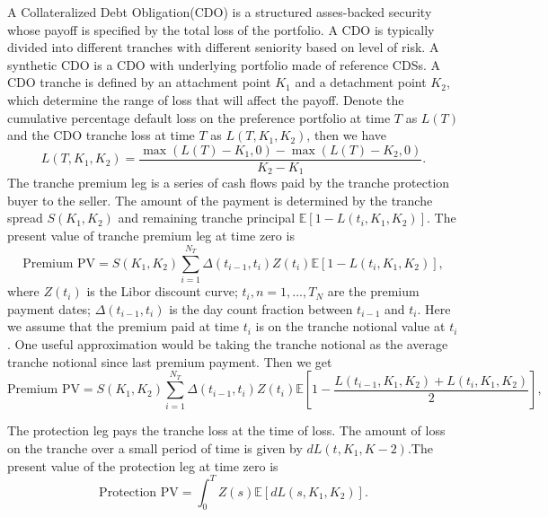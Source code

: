 \documentclass[11pt,a4paper]{article}
\theoremstyle{definition}
\numberwithin{equation}{section}
\begin{document}
	A Collateralized Debt Obligation(CDO) is a structured asses-backed security whose payoff is specified by the total loss of the portfolio. A CDO is typically divided into different tranches with different seniority based on level of risk. A synthetic CDO is a CDO with underlying portfolio made of reference CDSs. A CDO tranche is defined by an attachment point $K_1$ and a detachment point $K_2$, which determine the range of loss that will affect the payoff. Denote the cumulative percentage default loss on the preference portfolio at time $T$ as $L(T)$ and the CDO tranche loss at time $T$ as $L(T, K_1, K_2)$, then we have
	\begin{equation}
	L(T, K_1, K_2) = \frac{\max(L(T)-K_1,0)-\max(L(T)-K_2,0)}{K_2-K_1}.
	\end{equation}
	The tranche premium leg is a series of cash flows paid by the tranche protection buyer to the seller. The amount of the payment is determined by the tranche spread $S(K_1,K_2)$ and remaining tranche principal $\mathbb E[1-L(t_i, K_1, K_2)]$.
	The present value of tranche premium leg at time zero is
	\begin{equation}
	\text{Premium PV} = S(K_1,K_2)\sum_{i=1}^{N_T}\Delta(t_{i-1},t_i)Z(t_i)\mathbb E[1-L(t_i, K_1, K_2)],
	\end{equation}
	where $Z(t_i)$ is the Libor discount curve; $t_i, n = 1,...,T_N$ are the premium payment dates; $\Delta(t_{i-1},t_i)$ is the day count fraction between $t_{i-1}$ and $t_i$. Here we assume that the premium paid at time $t_i$ is on the tranche notional value at $t_i$. One useful approximation would be taking the tranche notional as the average tranche notional since last premium payment. Then we get
	\begin{equation}
	\text{Premium PV} = S(K_1,K_2)\sum_{i=1}^{N_T}\Delta(t_{i-1},t_i)Z(t_i)\mathbb E\left[1-\frac{L(t_{i-1}, K_1, K_2)+L(t_i, K_1, K_2)}{2}\right],
	\end{equation}
	
	
	The protection leg pays the tranche loss at the time of loss. The amount of loss on the tranche over a small period of time is given by $dL(t,K_1,K-2)$.The present value of the protection leg at time zero is 
	\begin{equation}
	\text{Protection PV} = \int_{0}^{T}Z(s)\mathbb E[dL(s,K_1,K_2)].
	\end{equation}
	
\end{document}
